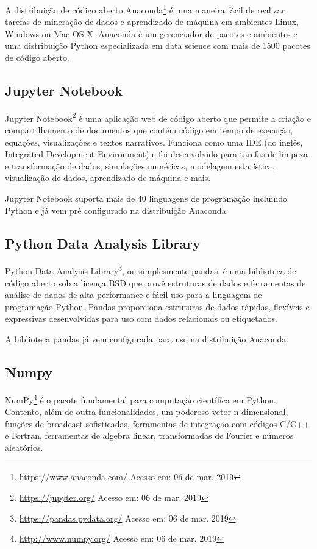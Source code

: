 A distribuição de código aberto
Anaconda\footnote{\url{https://www.anaconda.com/} Acesso em: 06 de mar. 2019}  é
uma maneira fácil de realizar tarefas de mineração de dados e aprendizado de
máquina em ambientes Linux, Windows ou Mac OS X. Anaconda é um gerenciador de
pacotes e ambientes e uma distribuição Python especializada em data science com
mais de 1500 pacotes de código aberto.

\subsection{Jupyter Notebook}

Jupyter Notebook\footnote{\url{https://jupyter.org/} Acesso em: 06 de mar. 2019}
é uma aplicação web de código aberto que permite a criação e compartilhamento de
documentos que contém código em tempo de execução, equações, visualizações e
textos narrativos. Funciona como uma IDE (do inglês, Integrated Development
Environment) e foi desenvolvido para tarefas de limpeza e transformação de
dados, simulações numéricas, modelagem estatística, visualização de dados,
aprendizado de máquina e mais.

Jupyter Notebook suporta mais de 40 linguagens de programação incluindo Python e
já vem pré configurado na distribuição Anaconda.

\subsection{Python Data Analysis Library}

Python Data Analysis Library\footnote{\url{https://pandas.pydata.org/} Acesso
em: 06 de mar. 2019}, ou simplesmente pandas, é uma biblioteca de código aberto
sob a licença BSD que provê estruturas de dados e ferramentas de análise de
dados de alta performance e fácil uso para a linguagem de programação Python.
Pandas proporciona estruturas de dados rápidas, flexíveis e expressivas
desenvolvidas para uso com dados relacionais ou etiquetados.

A biblioteca pandas já vem configurada para uso na distribuição Anaconda.

\subsection{Numpy}

NumPy\footnote{\url{http://www.numpy.org/} Acesso em: 06 de mar. 2019} é o
pacote fundamental para computação científica em Python. Contento, além de outra
funcionalidades, um poderoso vetor n-dimensional, funções de broadcast
sofisticadas, ferramentas de integração com códigos C/C++ e Fortran, ferramentas
de algebra linear, transformadas de Fourier e números aleatórios.

